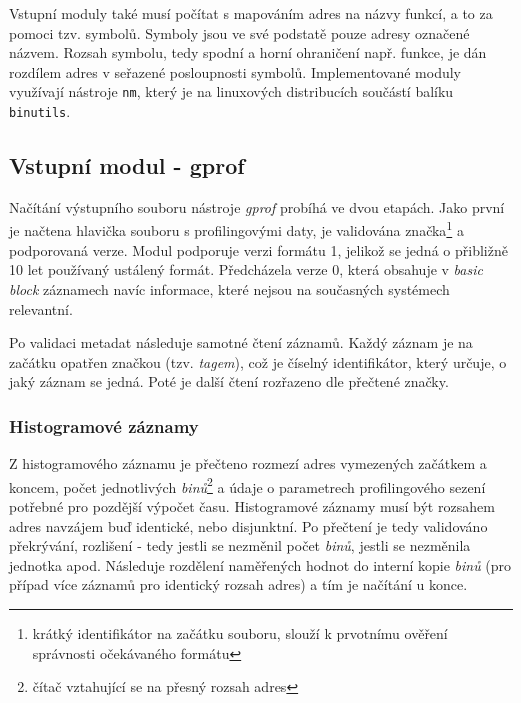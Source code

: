 \documentclass[czech,BP]{thesiskiv}
\begin{document}
Vstupní moduly také musí počítat s mapováním adres na názvy funkcí, a to za pomoci tzv. symbolů. Symboly jsou ve své podstatě pouze adresy označené názvem. Rozsah symbolu, tedy spodní a horní ohraničení např. funkce, je dán rozdílem adres v seřazené posloupnosti symbolů. Implementované moduly využívají nástroje \texttt{nm}, který je na linuxových distribucích součástí balíku \texttt{binutils}.

\subsection{Vstupní modul - gprof}

Načítání výstupního souboru nástroje \emph{gprof} probíhá ve dvou etapách. Jako první je načtena hlavička souboru s profilingovými daty, je validována  značka\footnote{krátký identifikátor na začátku souboru, slouží k prvotnímu ověření správnosti očekávaného formátu} a podporovaná verze. Modul podporuje verzi formátu 1, jelikož se jedná o přibližně 10 let používaný ustálený formát. Předcházela verze 0, která obsahuje v \emph{basic block} záznamech navíc informace, které nejsou na současných systémech relevantní.

Po validaci metadat následuje samotné čtení záznamů. Každý záznam je na začátku opatřen značkou (tzv. \emph{tagem}), což je číselný identifikátor, který určuje, o jaký záznam se jedná. Poté je další čtení rozřazeno dle přečtené značky.

\subsubsection*{Histogramové záznamy}

Z histogramového záznamu je přečteno rozmezí adres vymezených začátkem a koncem, počet jednotlivých \emph{binů}\footnote{čítač vztahující se na přesný rozsah adres} a údaje o parametrech profilingového sezení potřebné pro pozdější výpočet času. Histogramové záznamy musí být rozsahem adres navzájem buď identické, nebo disjunktní. Po přečtení je tedy validováno překrývání, rozlišení - tedy jestli se nezměnil počet \emph{binů}, jestli se nezměnila jednotka apod. Následuje rozdělení naměřených hodnot do interní kopie \emph{binů} (pro případ více záznamů pro identický rozsah adres) a tím je načítání u konce.
\end{document}
